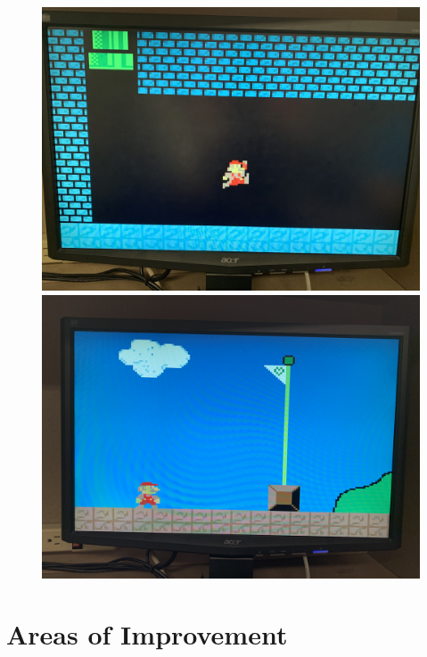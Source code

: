 \documentclass[12pt]{article}
\begin{document}
\begin{figure}
  \centering
  \begin{minipage}[b]{0.5\textwidth}
    \includegraphics[width=\textwidth]{IMG_1891.jpg}
  \end{minipage}
  \begin{minipage}[b]{0.5\textwidth}
    \includegraphics[width=\textwidth]{IMG_1892.jpg}
  \end{minipage}
\end{figure}


\section{Areas of Improvement}
\end{document}

